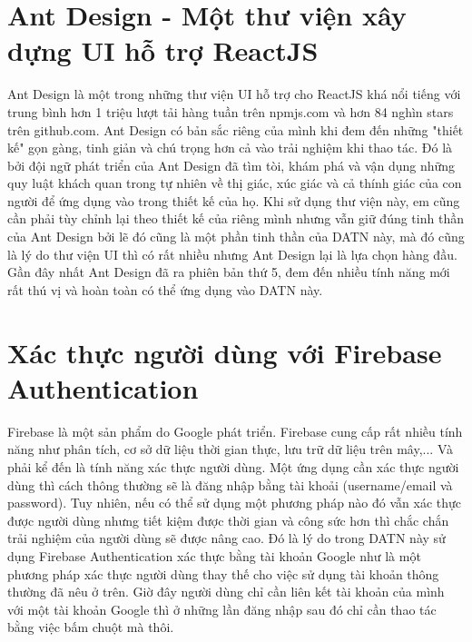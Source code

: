 \documentclass[../DoAn.tex]{subfiles}
\begin{document}
\section{Ant Design - Một thư viện xây dựng UI hỗ trợ ReactJS\cite{Antd}}
Ant Design là một trong những thư viện UI hỗ trợ cho ReactJS khá nổi tiếng với trung bình hơn 1 triệu lượt tải hàng tuần trên npmjs.com và hơn 84 nghìn stars trên github.com. Ant Design có bản sắc riêng của mình khi đem đến những "thiết kế" gọn gàng, tinh giản và chú trọng hơn cả vào trải nghiệm khi thao tác. Đó là bởi đội ngữ phát triển của Ant Design đã tìm tòi, khám phá và vận dụng những quy luật khách quan trong tự nhiên về thị giác, xúc giác và cả thính giác của con người để ứng dụng vào trong thiết kế của họ. Khi sử dụng thư viện này, em cũng cần phải tùy chỉnh lại theo thiết kế của riêng mình nhưng vẫn giữ đúng tinh thần của Ant Design bởi lẽ đó cũng là một phần tinh thần của DATN này, mà đó cũng là lý do thư viện UI thì có rất nhiều nhưng Ant Design lại là lựa chọn hàng đầu. Gần đây nhất Ant Design đã ra phiên bản thứ 5, đem đến nhiều tính năng mới rất thú vị và hoàn toàn có thể ứng dụng vào DATN này.

\section{Xác thực người dùng với Firebase Authentication\cite{FirebaseAuthentication}}
Firebase là một sản phẩm do Google phát triển. Firebase cung cấp rất nhiều tính năng như phân tích, cơ sở dữ liệu thời gian thực, lưu trữ dữ liệu trên mây,... Và phải kể đến là tính năng xác thực người dùng. Một ứng dụng cần xác thực người dùng thì cách thông thường sẽ là đăng nhập bằng tài khoải (username/email và password). Tuy nhiên, nếu có thể sử dụng một phương pháp nào đó vẫn xác thực được người dùng nhưng tiết kiệm được thời gian và công sức hơn thì chắc chắn trải nghiệm của người dùng sẽ được nâng cao. Đó là lý do trong DATN này sử dụng Firebase Authentication xác thực bằng tài khoản Google như là một phương pháp xác thực người dùng thay thế cho việc sử dụng tài khoản thông thường đã nêu ở trên. Giờ đây người dùng chỉ cần liên kết tài khoản của mình với một tài khoản Google thì ở những lần đăng nhập sau đó chỉ cần thao tác bằng việc bấm chuột mà thôi. 
\end{document}
